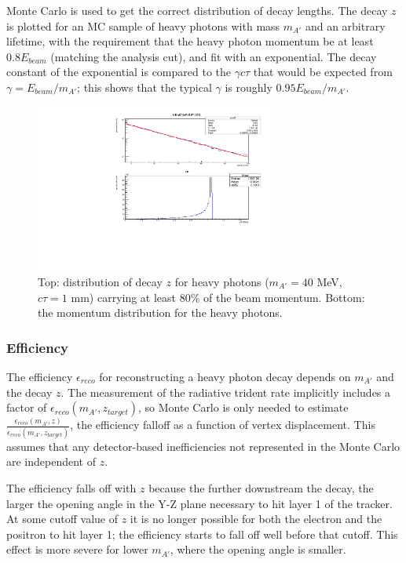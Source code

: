 Monte Carlo is used to get the correct distribution of decay lengths.
The decay $z$ is plotted for an MC sample of heavy photons with mass $m_{A'}$ and an arbitrary lifetime, with the requirement that the heavy photon momentum be at least $0.8E_{beam}$ (matching the analysis cut), and fit with an exponential.
The decay constant of the exponential is compared to the $\gamma c \tau$ that would be expected from $\gamma=E_{beam}/m_{A'}$; this shows that the typical $\gamma$ is roughly $0.95E_{beam}/m_{A'}$.

\begin{figure}[ht]
\begin{center}
    \includegraphics[width=0.7\textwidth,page=1,angle=-90]{vertexing/figs/acceptance_40}
\end{center}
    \caption{Top: distribution of decay $z$ for heavy photons ($m_{A'}=40$ MeV, $c\tau=1$ mm) carrying at least 80\% of the beam momentum. Bottom: the momentum distribution for the heavy photons.}
    \label{fig:decay_z_truth}
\end{figure}

\subsubsection{Efficiency}

The efficiency $\epsilon_{reco}$ for reconstructing a heavy photon decay depends on $m_{A'}$ and the decay $z$.
The measurement of the radiative trident rate implicitly includes a factor of $\epsilon_{reco}(m_{A'},z_{target})$, so Monte Carlo is only needed to estimate $\frac{\epsilon_{reco}(m_{A'},z)}{\epsilon_{reco}(m_{A'},z_{target})}$, the efficiency falloff as a function of vertex displacement.
This assumes that any detector-based inefficiencies not represented in the Monte Carlo are independent of $z$.

The efficiency falls off with $z$ because the further downstream the decay, the larger the opening angle in the Y-Z plane necessary to hit layer 1 of the tracker.
At some cutoff value of $z$ it is no longer possible for both the electron and the positron to hit layer 1; the efficiency starts to fall off well before that cutoff.
This effect is more severe for lower $m_{A'}$, where the opening angle is smaller.

